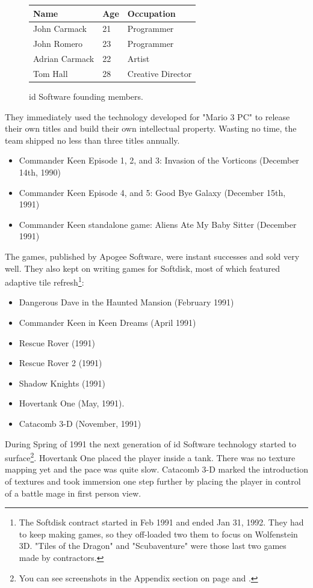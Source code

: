 \documentclass[book.tex]{subfiles}
\begin{document}
 \begin{figure}[H]
\centering  
\begin{tabularx}{\textwidth}{ X  X  X  }
  \toprule
  \textbf{Name} &  \textbf{Age} & \textbf{Occupation} \\
  \toprule 
   John Carmack & 21 &  Programmer\\
   John Romero & 23 &  Programmer\\
   Adrian Carmack & 22 &  Artist\\
   Tom Hall & 28 &  Creative Director\\
     \toprule
\end{tabularx}
\caption{id Software founding members.}\label{fig:Id Software team}
\end{figure}
\pagebreak
They immediately used the technology developed for "Mario 3 PC" to release their own titles and build their own intellectual property. Wasting no time, the team shipped no less than three titles annually.
\begin{itemize}
    \item Commander Keen Episode 1, 2, and 3: Invasion of the Vorticons (December 14th, 1990)
    \item Commander Keen Episode 4, and 5: Good Bye Galaxy (December 15th, 1991)
    \item Commander Keen standalone game: Aliens Ate My Baby Sitter (December 1991)
\end{itemize}
The games, published by Apogee Software, were instant successes and sold very well. They also kept on writing games for Softdisk, most of which featured adaptive tile refresh\footnote{The Softdisk contract started in Feb 1991 and ended Jan 31, 1992. They had to keep making games, so they off-loaded two them to focus on Wolfenstein 3D. "Tiles of the Dragon" and "Scubaventure" were those last two games made by contractors.}:
\begin{itemize}
  \item Dangerous Dave in the Haunted Mansion (February 1991)
  \item Commander Keen in Keen Dreams (April 1991)
  \item Rescue Rover (1991)
  \item Rescue Rover 2 (1991)
  \item Shadow Knights (1991)
  \item Hovertank One (May, 1991).
  \item Catacomb 3-D (November, 1991)
\end{itemize}
During Spring of 1991 the next generation of id Software technology started to surface\footnote{You can see screenshots in the Appendix section on page \pageref{hovertank3d_screenshot} and \pageref{catacomb3d_screenshot}.}. Hovertank One placed the player inside a tank. There was no texture mapping yet and the pace was quite slow. Catacomb 3-D marked the introduction of textures and took immersion one step further by placing the player in control of a battle mage in first person view. \\
\end{document}
